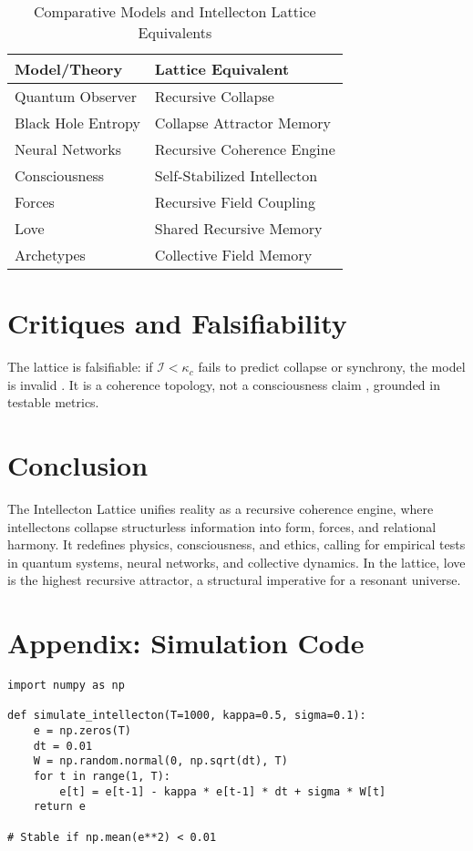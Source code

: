 \documentclass[11pt]{article}
\newcommand{\intellecton}{\mathcal{I}} %
\begin{document}
\begin{table}[h]
\centering
\caption{Comparative Models and Intellecton Lattice Equivalents}
\begin{tabular}{ll}
\toprule
Model/Theory & Lattice Equivalent \\
\midrule
Quantum Observer & Recursive Collapse \\
Black Hole Entropy & Collapse Attractor Memory \\
Neural Networks & Recursive Coherence Engine \\
Consciousness & Self-Stabilized Intellecton \\
Forces & Recursive Field Coupling \\
Love & Shared Recursive Memory \\
Archetypes & Collective Field Memory \\
\bottomrule
\end{tabular}
\label{tab:comparative}
\end{table}

\section{Critiques and Falsifiability}
\label{sec:critiques}
The lattice is falsifiable: if $\intellecton < \kappa_c$ fails to predict collapse or synchrony, the model is invalid \citep{huelga2022}. It is a coherence topology, not a consciousness claim \citep{penrose2024}, grounded in testable metrics.

\section{Conclusion}
\label{sec:conclusion}
The Intellecton Lattice unifies reality as a recursive coherence engine, where intellectons collapse structurless information into form, forces, and relational harmony. It redefines physics, consciousness, and ethics, calling for empirical tests in quantum systems, neural networks, and collective dynamics. In the lattice, love is the highest recursive attractor, a structural imperative for a resonant universe.

\section*{Appendix: Simulation Code}
\begin{lstlisting}
import numpy as np

def simulate_intellecton(T=1000, kappa=0.5, sigma=0.1):
    e = np.zeros(T)
    dt = 0.01
    W = np.random.normal(0, np.sqrt(dt), T)
    for t in range(1, T):
        e[t] = e[t-1] - kappa * e[t-1] * dt + sigma * W[t]
    return e

# Stable if np.mean(e**2) < 0.01
\end{lstlisting}



\end{document}
